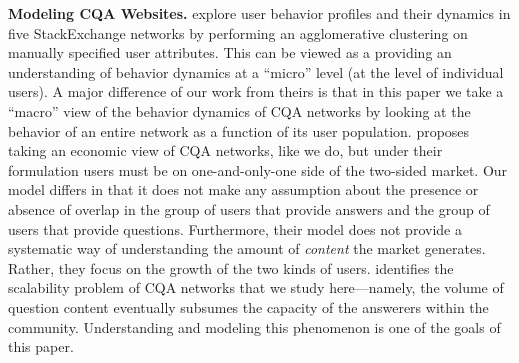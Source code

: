 \textbf{Modeling CQA Websites.} \citet{furtado2013} explore user behavior
profiles and their dynamics in five StackExchange networks by performing an
agglomerative clustering on manually specified user attributes. This can be
viewed as a providing an understanding of behavior dynamics at a ``micro''
level (at the level of individual users). A major difference of our work
from theirs is that in this paper we take a ``macro'' view of the behavior
dynamics of CQA networks by looking at the behavior of an entire network as
a function of its user population. \citet{Kumar2010} proposes taking an
economic view of CQA networks, like we do, but under their formulation
users must be on one-and-only-one side of the two-sided market. Our model
differs in that it does not make any assumption about the presence or
absence of overlap in the group of users that provide answers and the group
of users that provide questions. Furthermore, their model does not provide
a systematic way of understanding the amount of \emph{content} the market
generates. Rather, they focus on the growth of the two kinds of users.
\citet{Yang2015} identifies the scalability problem of CQA networks that we
study here---namely, the volume of question content eventually subsumes the
capacity of the answerers within the community. Understanding and modeling
this phenomenon is one of the goals of this paper.



